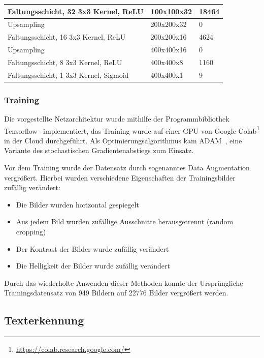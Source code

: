 \begin{table}
\begin{tabular}{|l|l|l|}
        \hline

        Faltungsschicht, 32 3x3 Kernel, ReLU   & 100x100x32                  & 18464                     \\

        \hline

        Upsampling                             & 200x200x32                  & 0                         \\

        \hline

        Faltungsschicht, 16 3x3 Kernel, ReLU   & 200x200x16                  & 4624                      \\

        \hline

        Upsampling                             & 400x400x16                  & 0                         \\

        \hline

        Faltungsschicht, 8 3x3 Kernel, ReLU    & 400x400x8                   & 1160                      \\

        \hline

        Faltungsschicht, 1 3x3 Kernel, Sigmoid & 400x400x1                   & 9                         \\

        \hline
    \end{tabular}
\end{table}

\subsubsection{Training}

Die vorgestellte Netzarchitektur wurde mithilfe der
Programmbibliothek Tensorflow~\cite{tensorflow2015-whitepaper}
implementiert,
das Training wurde auf einer GPU von Google
Colab\footnote{\url{https://colab.research.google.com/}} in der Cloud
durchgef\"uhrt.
Als Optimierungsalgorithmus kam ADAM~\cite{adam},
eine Variante des stochastischen Gradientenabstiegs zum Einsatz.

Vor dem Training wurde der Datensatz durch sogenanntes Data Augmentation
vergr\"o{\ss}ert. Hierbei wurden verschiedene Eigenschaften der
Trainingsbilder zuf\"allig ver\"andert:
\begin{itemize}
    \item Die Bilder wurden horizontal gespiegelt
    \item Aus jedem Bild wurden zuf\"allige Ausschnitte herausgetrennt (random cropping)
    \item Der Kontrast der Bilder wurde zuf\"allig ver\"andert
    \item Die Helligkeit der Bilder wurde zuf\"allig ver\"andert
\end{itemize}
Durch das wiederholte Anwenden dieser Methoden konnte der Urspr\"ungliche
Trainingsdatensatz von 949 Bildern auf 22776 Bilder vergr\"o{\ss}ert werden.

\subsection{Texterkennung}
\label{sec:texterkennung}